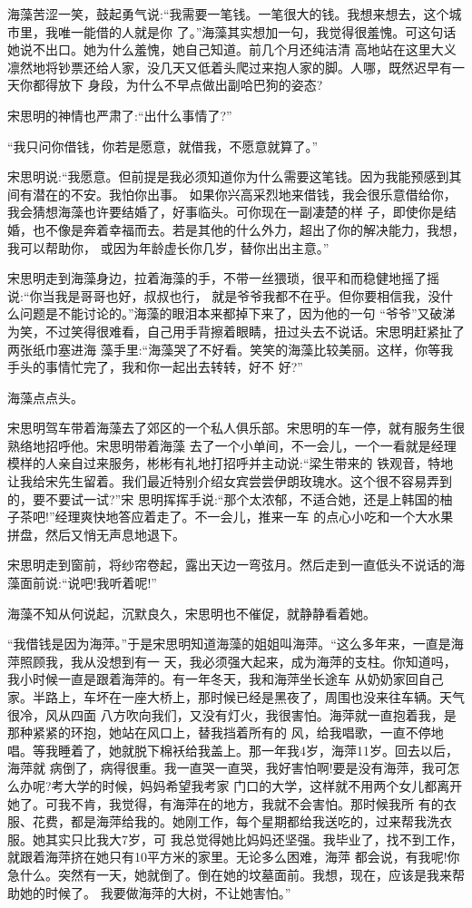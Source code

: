 \documentclass[11pt,a4paper,onecolumn]{article}
\begin{document}
海藻苦涩一笑，鼓起勇气说:``我需要一笔钱。一笔很大的钱。我想来想去，这个城市里，我唯一能借的人就是你
了。''海藻其实想加一句，我觉得很羞愧。可这句话她说不出口。她为什么羞愧，她自己知道。前几个月还纯洁清
高地站在这里大义凛然地将钞票还给人家，没几天又低着头爬过来抱人家的脚。人哪，既然迟早有一天你都得放下
身段，为什么不早点做出副哈巴狗的姿态?

宋思明的神情也严肃了:``出什么事情了?''

``我只问你借钱，你若是愿意，就借我，不愿意就算了。''

宋思明说:``我愿意。但前提是我必须知道你为什么需要这笔钱。因为我能预感到其间有潜在的不安。我怕你出事。
如果你兴高采烈地来借钱，我会很乐意借给你，我会猜想海藻也许要结婚了，好事临头。可你现在一副凄楚的样
子，即使你是结婚，也不像是奔着幸福而去。若是其他的什么外力，超出了你的解决能力，我想，我可以帮助你，
或因为年龄虚长你几岁，替你出出主意。''

宋思明走到海藻身边，拉着海藻的手，不带一丝猥琐，很平和而稳健地摇了摇说:``你当我是哥哥也好，叔叔也行，
就是爷爷我都不在乎。但你要相信我，没什么问题是不能讨论的。''海藻的眼泪本来都掉下来了，因为他的一句
``爷爷''又破涕为笑，不过笑得很难看，自己用手背擦着眼睛，扭过头去不说话。宋思明赶紧扯了两张纸巾塞进海
藻手里:``海藻哭了不好看。笑笑的海藻比较美丽。这样，你等我手头的事情忙完了，我和你一起出去转转，好不
好?''

海藻点点头。

宋思明驾车带着海藻去了郊区的一个私人俱乐部。宋思明的车一停，就有服务生很熟络地招呼他。宋思明带着海藻
去了一个小单间，不一会儿，一个一看就是经理模样的人亲自过来服务，彬彬有礼地打招呼并主动说:``梁生带来的
铁观音，特地让我给宋先生留着。我们最近特别介绍女宾尝尝伊朗玫瑰水。这个很不容易弄到的，要不要试一试?''宋
思明挥挥手说:``那个太浓郁，不适合她，还是上韩国的柚子茶吧!''经理爽快地答应着走了。不一会儿，推来一车
的点心小吃和一个大水果拼盘，然后又悄无声息地退下。

宋思明走到窗前，将纱帘卷起，露出天边一弯弦月。然后走到一直低头不说话的海藻面前说:``说吧!我听着呢!''

海藻不知从何说起，沉默良久，宋思明也不催促，就静静看着她。

``我借钱是因为海萍。''于是宋思明知道海藻的姐姐叫海萍。``这么多年来，一直是海萍照顾我，我从没想到有一
天，我必须强大起来，成为海萍的支柱。你知道吗，我小时候一直是跟着海萍的。有一年冬天，我和海萍坐长途车
从奶奶家回自己家。半路上，车坏在一座大桥上，那时候已经是黑夜了，周围也没来往车辆。天气很冷，风从四面
八方吹向我们，又没有灯火，我很害怕。海萍就一直抱着我，是那种紧紧的环抱，她站在风口上，替我挡着所有的
风，给我唱歌，一直不停地唱。等我睡着了，她就脱下棉袄给我盖上。那一年我4岁，海萍11岁。回去以后，海萍就
病倒了，病得很重。我一直哭一直哭，我好害怕啊!要是没有海萍，我可怎么办呢?考大学的时候，妈妈希望我考家
门口的大学，这样就不用两个女儿都离开她了。可我不肯，我觉得，有海萍在的地方，我就不会害怕。那时候我所
有的衣服、花费，都是海萍给我的。她刚工作，每个星期都给我送吃的，过来帮我洗衣服。她其实只比我大7岁，可
我总觉得她比妈妈还坚强。我毕业了，找不到工作，就跟着海萍挤在她只有10平方米的家里。无论多么困难，海萍
都会说，有我呢!你急什么。突然有一天，她就倒了。倒在她的坟墓面前。我想，现在，应该是我来帮助她的时候了。
我要做海萍的大树，不让她害怕。''
\end{document}

